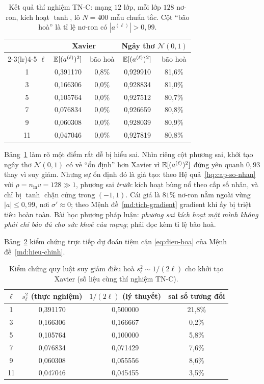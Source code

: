 \begin{table}[H]
\centering
\caption{Kết quả thí nghiệm TN-C: mạng $12$ lớp, mỗi lớp $128$ nơ-ron, kích hoạt
$\tanh$, lô $N = 400$ mẫu chuẩn tắc. Cột ``bão hoà'' là tỉ lệ nơ-ron có
$|a^{(\ell)}| > 0{,}99$.}
\label{tab:so-lieu-khoitao}
\begin{tabular}{@{}c cc cc@{}}
\toprule
& \multicolumn{2}{c}{\textbf{Xavier}}
& \multicolumn{2}{c}{\textbf{Ngây thơ } $\mathcal{N}(0,1)$} \\
\cmidrule(lr){2-3}\cmidrule(lr){4-5}
$\ell$ & $\mathbb{E}[(a^{(\ell)})^2]$ & bão hoà & $\mathbb{E}[(a^{(\ell)})^2]$ & bão hoà \\
\midrule
1  & 0{,}391170 & 0{,}8\% & 0{,}929910 & 81{,}6\% \\
3  & 0{,}166306 & 0{,}0\% & 0{,}928834 & 81{,}0\% \\
5  & 0{,}105764 & 0{,}0\% & 0{,}927512 & 80{,}7\% \\
7  & 0{,}076834 & 0{,}0\% & 0{,}926659 & 80{,}8\% \\
9  & 0{,}060308 & 0{,}0\% & 0{,}928039 & 80{,}9\% \\
11 & 0{,}047046 & 0{,}0\% & 0{,}927819 & 80{,}8\% \\
\bottomrule
\end{tabular}
\end{table}
 
Bảng~\ref{tab:so-lieu-khoitao} làm rõ một điểm rất dễ bị hiểu sai. Nhìn riêng
cột phương sai, khởi tạo ngây thơ $\mathcal{N}(0,1)$ có vẻ ``ổn định'' hơn
Xavier vì $\mathbb{E}[(a^{(\ell)})^2]$ đứng yên quanh $0{,}93$ thay vì suy giảm. Nhưng
sự ổn định đó là giả tạo: theo Hệ quả~\ref{hq:cap-so-nhan} với
$\rho = n_{\text{in}}v = 128 \gg 1$, phương sai \emph{trước} kích hoạt bùng nổ
theo cấp số nhân, và chỉ bị $\tanh$ chặn cứng trong $(-1,1)$. Cái giá là $81\%$
nơ-ron nằm ngoài vùng $|a| \le 0{,}99$, nơi $\sigma' \approx 0$; theo
Mệnh đề~\ref{md:tich-gradient} gradient khi ấy bị triệt tiêu hoàn toàn. Bài học
phương pháp luận: \emph{phương sai kích hoạt một mình không phải chỉ báo đủ cho
sức khoẻ của mạng}; phải đọc kèm tỉ lệ bão hoà.
 
Bảng~\ref{tab:dieu-hoa} kiểm chứng trực tiếp dự đoán tiệm cận
\eqref{eq:dieu-hoa} của Mệnh đề~\ref{md:hieu-chinh}.
 
\begin{table}[H]
\centering
\caption{Kiểm chứng quy luật suy giảm điều hoà $s_\ell^2 \sim 1/(2\ell)$ cho
khởi tạo Xavier (số liệu cùng thí nghiệm TN-C).}
\label{tab:dieu-hoa}
\begin{tabular}{@{}c c c c@{}}
\toprule
$\ell$ & $s_\ell^2$ (thực nghiệm) & $1/(2\ell)$ (lý thuyết)
  & sai số tương đối \\
\midrule
1  & 0{,}391170 & 0{,}500000 & 21{,}8\% \\
3  & 0{,}166306 & 0{,}166667 & 0{,}2\% \\
5  & 0{,}105764 & 0{,}100000 & 5{,}8\% \\
7  & 0{,}076834 & 0{,}071429 & 7{,}6\% \\
9  & 0{,}060308 & 0{,}055556 & 8{,}6\% \\
11 & 0{,}047046 & 0{,}045455 & 3{,}5\% \\
\bottomrule
\end{tabular}
\end{table}
 
